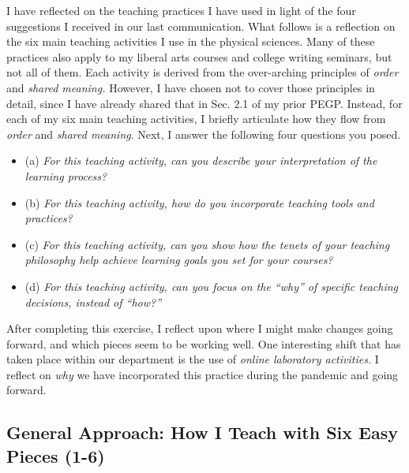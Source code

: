 \documentclass[../../../main.tex]{subfiles}
\begin{document}
I have reflected on the teaching practices I have used in light of the four suggestions I received in our last communication.  What follows is a reflection on the six main teaching activities I use in the physical sciences.  Many of these practices also apply to my liberal arts courses and college writing seminars, but not all of them.  Each activity is derived from the over-arching principles of \textit{order} and \textit{shared meaning.}  However, I have chosen not to cover those principles in detail, since I have already shared that in Sec. 2.1 of my prior PEGP.  Instead, for each of my six main teaching activities, I briefly articulate how they flow from \textit{order} and \textit{shared meaning}.  Next, I answer the following four questions you posed.
\begin{itemize}
\item (a) \textit{For this teaching activity, can you describe your interpretation of the learning process?}
\item (b) \textit{For this teaching activity, how do you incorporate teaching tools and practices?}
\item (c) \textit{For this teaching activity, can you show how the tenets of your teaching philosophy help achieve learning goals you set for your courses?}
\item (d) \textit{For this teaching activity, can you focus on the ``why'' of specific teaching decisions, instead of ``how?''}
\end{itemize} 
After completing this exercise, I reflect upon where I might make changes going forward, and which pieces seem to be working well.  One interesting shift that has taken place within our department is the use of \textit{online laboratory activities.}  I reflect on \textit{why} we have incorporated this practice during the pandemic and going forward.

\subsection{General Approach: How I Teach with Six Easy Pieces (1-6)}
\end{document}
